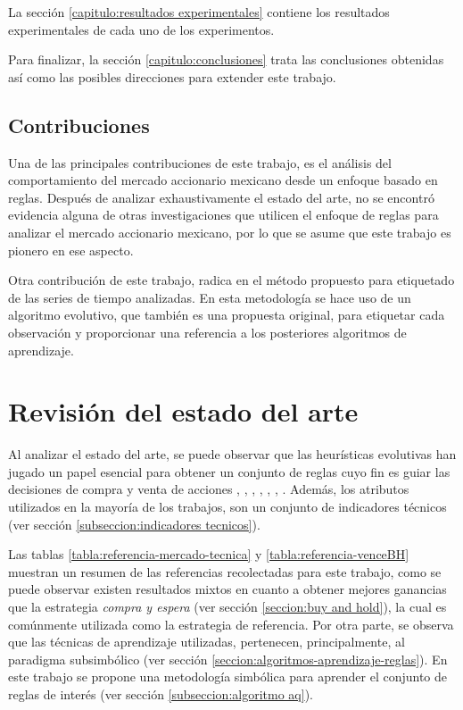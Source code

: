 \documentclass[12pt]{report}
\theoremstyle{break}
\theoremstyle{break}
\begin{document}
La sección \ref{capitulo:resultados experimentales} contiene los resultados experimentales de cada uno de los experimentos.

Para finalizar, la sección \ref{capitulo:conclusiones} trata las conclusiones obtenidas así como las posibles direcciones para extender este trabajo.

\section{Contribuciones}
\label{seccion:contribuciones}
Una de las principales contribuciones de este trabajo, es el análisis del comportamiento del mercado accionario mexicano desde un enfoque basado en reglas. Después de analizar exhaustivamente el estado del arte, no se encontró evidencia alguna de otras investigaciones que utilicen el enfoque de reglas para analizar el mercado accionario mexicano, por lo que se asume que este trabajo es pionero en ese aspecto.

Otra contribución de este trabajo, radica en el método propuesto para etiquetado de las series de tiempo analizadas. En esta metodología se hace uso de un algoritmo evolutivo, que también es una propuesta original, para etiquetar cada observación y proporcionar una referencia a los posteriores algoritmos de aprendizaje.

\chapter[Capítulo \thechapter: Revisión del estado del arte]{Revisión del estado del arte}
\label{capitulo:antecedentes}

Al analizar el estado del arte, se puede observar que las heurísticas evolutivas han jugado un papel esencial para obtener un conjunto de reglas cuyo fin es guiar las decisiones de compra y venta de acciones \cite{Allen1999}, \cite{Canelas2012-gecco}, \cite{Canelas2013-gecco}, \cite{Canelas2013-journal}, \cite{Leitao2016}, \cite{Potvin2004}, \cite{Kampouridis2017}. Además, los atributos utilizados en la mayoría de los trabajos, son un conjunto de indicadores técnicos (ver sección \ref{subseccion:indicadores tecnicos}).

Las tablas \ref{tabla:referencia-mercado-tecnica} y \ref{tabla:referencia-venceBH} muestran un resumen de las referencias recolectadas para este trabajo, como se puede observar existen resultados mixtos en cuanto a obtener mejores ganancias que la estrategia \textit{compra y espera} (ver sección \ref{seccion:buy and hold}), la cual es comúnmente  utilizada como la estrategia de referencia. Por otra parte, se observa que las técnicas de aprendizaje utilizadas, pertenecen, principalmente, al paradigma subsimbólico (ver sección \ref{seccion:algoritmos-aprendizaje-reglas}). En este trabajo se propone una metodología simbólica para aprender el conjunto de reglas de interés (ver sección \ref{subseccion:algoritmo aq}).
\end{document}
